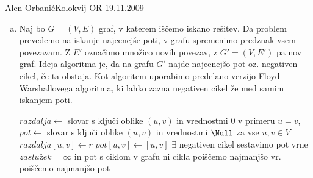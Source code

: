 \begin{naloga}{Alen Orbanić}{Kolokvij OR 19.11.2009}
\begin{vprasanje}
\begin{slika}
\pgfslika
{}
\end{slika}
\end{vprasanje}
\begin{odgovor}
\begin{enumerate}[(a)]
\item Naj bo $G=(V,E)$ graf, v katerem iščemo iskano rešitev. Da problem prevedemo na 
iskanje najcenejše poti, v grafu spremenimo predznak vsem povezavam. Z $E'$ označimo
množico novih povezav, z $G'=(V,E')$ pa nov graf. Ideja algoritma je, da na grafu $G'$
najde najcenejšo pot oz. negativen cikel, če ta obstaja. Kot algoritem uporabimo 
predelano verzijo Floyd-Warshallovega algoritma, ki lahko zazna negativen cikel že med 
samim iskanjem poti. 
\\
\begin{small}
\begin{algorithmic}
    \State $razdalja \gets$  slovar s ključi oblike $(u,v)$ in vrednostmi
    0 v primeru $u=v$,
	\State $pot \gets$ slovar s ključi oblike $(u,v)$ in vrednostmi $\Null$
    za vse $u,v \in V$
            \State $razdalja[u, v] \gets r$
            \State $pot[u,v] \gets [u,v]$
        \EndFor
    \EndFor
             \hfill $\exists$ negativen cikel
                 \hfill sestavimo pot
                     \hfill vrne $zaslužek = \infty$ in pot s ciklom
            \EndIf
                \EndIf 
            \EndFor
        \EndFor
    \EndFor \hfill v grafu ni cikla
 \hfill poiščemo najmanjšo vr.
 \hfill poiščemo najmanjšo pot
    \EndIf
\EndFor
{}
\EndFunction
\end{algorithmic}
\end{small}


\end{enumerate}
\end{odgovor}
\end{naloga}
